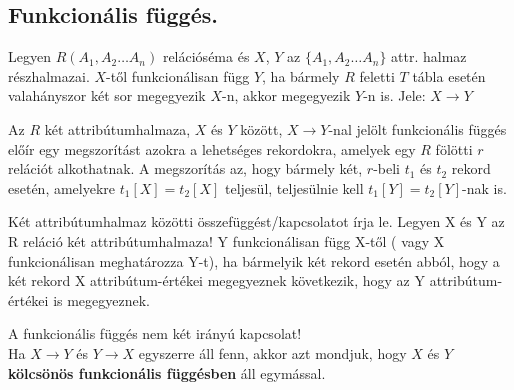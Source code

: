 \subsection{Funkcionális függés.}
\begin{definition}[1]
	Legyen $R(A_1 , A_2 \dots A_n)$ relációséma és $X$, $Y$ az $\{A_1 , A_2 \dots A_n\}$ attr. halmaz részhalmazai. $X$-től funkcionálisan függ $Y$, ha bármely $R$ feletti $T$ tábla esetén valahányszor két sor megegyezik $X$-n, akkor megegyezik $Y$-n is. Jele: $X \to Y$
\end{definition}
\begin{definition}[2]
	Az $R$ két attribútumhalmaza, $X$ és $Y$ között, $X \to Y$-nal jelölt funkcionális függés előír egy megszorítást azokra a lehetséges rekordokra, amelyek egy $R$ fölötti $r$ relációt alkothatnak. A megszorítás az, hogy bármely két, $r$-beli $t_1$ és $t_2$ rekord esetén, amelyekre $t_1[X] = t_2[X]$ teljesül, teljesülnie kell $t_1[Y] = t_2[Y]$-nak is.
\end{definition}
\begin{note}
	Két attribútumhalmaz közötti összefüggést/kapcsolatot írja le. Legyen X és Y az R reláció két attribútumhalmaza! Y funkcionálisan függ X-től ( vagy X funkcionálisan meghatározza Y-t), ha bármelyik két rekord esetén abból, hogy a két rekord X attribútum-értékei megegyeznek következik, hogy az Y attribútum-értékei is megegyeznek.
\end{note}
\begin{note}
	A funkcionális függés nem két irányú kapcsolat!\\
	Ha $X \to Y$ és $Y \to X$ egyszerre áll fenn, akkor azt mondjuk, hogy $X$ és $Y$ \textbf{kölcsönös funkcionális függésben} áll egymással.
\end{note}


